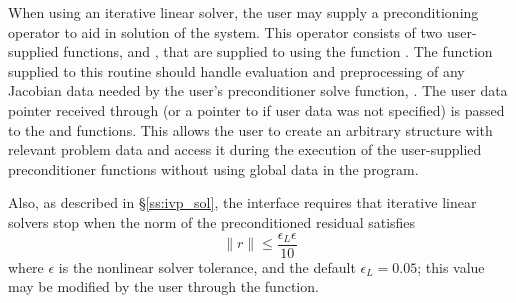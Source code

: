 When using an iterative linear solver, the user may supply a
preconditioning operator to aid in solution of the system.  This
operator consists of two user-supplied functions,  and
, that are supplied to {\cvode} using the function
.  The  function supplied to
this routine should handle evaluation and preprocessing of any
Jacobian data needed by the user's preconditioner solve function,
.  The user data pointer received through
 (or a pointer to  if user data was not
specified) is passed to the  and  functions.
This allows the user to create an arbitrary structure with relevant
problem data and access it during the execution of the user-supplied
preconditioner functions without using global data in the program.

Also, as described in \S\ref{ss:ivp_sol}, the {\cvls} interface
requires that iterative linear solvers stop when the norm of the
preconditioned residual satisfies
\[
  \|r\| \le \frac{\epsilon_L \epsilon}{10}
\]
where $\epsilon$ is the nonlinear solver tolerance, and the default
$\epsilon_L = 0.05$; this value may be modified by the user through
the  function.


